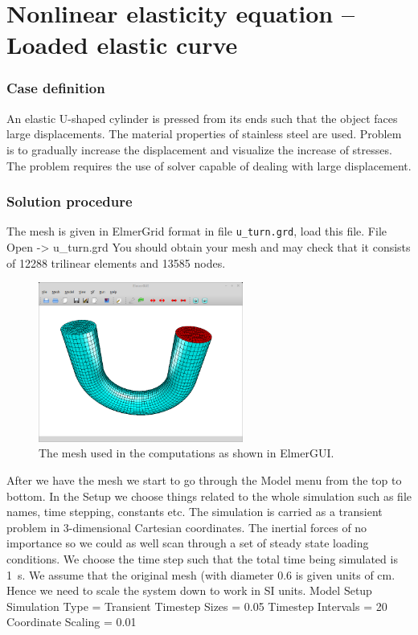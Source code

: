 \chapter{Nonlinear elasticity equation -- Loaded elastic curve}



\subsection*{Case definition}

An elastic U-shaped cylinder is pressed from its ends such that
the object faces large displacements. The material properties of
stainless steel are used. Problem is to gradually increase the displacement
and visualize the increase of stresses. The problem requires the use
of solver capable of dealing with large displacement.


\subsection*{Solution procedure}

The mesh is given in ElmerGrid format in file \texttt{u\_turn.grd},
load this file.
\ttbegin
File 
  Open -> u\_turn.grd
\ttend
You should obtain your mesh and may check that it consists of 12288 trilinear elements and 13585 nodes.
\begin{figure}[h!]
\begin{center}
  \includegraphics[width=0.6\textwidth]{UturnElmerGUI}
  \caption{The mesh used in the computations as shown in ElmerGUI.}
  \label{fig:UturnElmerGUI}
\end{center}
\end{figure}

After we have the mesh we start to go through the Model menu from the top to bottom. 
In the Setup we choose things related to the whole simulation such as file names, 
time stepping, constants etc.
The simulation is carried as a transient problem in 3-dimensional Cartesian
coordinates. The inertial forces of no importance so we could as well scan through a set of steady state
loading conditions. We choose the time step such that the total time being simulated is 1~s.
We assume that the original mesh (with diameter 0.6 is given units of cm. Hence we need to scale the
system down to work in SI units. 
\ttbegin
Model
  Setup 
    Simulation Type = Transient
    Timestep Sizes = 0.05
    Timestep Intervals = 20
    Coordinate Scaling = 0.01
\ttend


